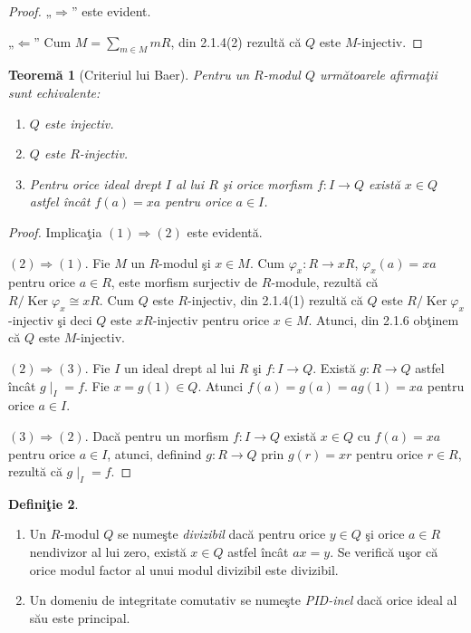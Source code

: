 \documentclass[12pt,a4paper]{book}
\DeclareMathOperator{\Ker}{Ker}
\theoremstyle{plain}
\newtheorem{theorem}{Teoremă}[section] %
\theoremstyle{definition}
\newtheorem{definition}[theorem]{Definiţie}
\theoremstyle{remark}
\begin{document}
\begin{proof}
„\(\Rightarrow\)” este evident.

„\(\Leftarrow\)” Cum \(M = \sum_{m \in M} mR\), din 2.1.4(2) rezultă
că \(Q\) este \(M\)-injectiv.
\end{proof}

\begin{theorem}[Criteriul lui Baer]\label{thm:Baer-ro}
Pentru un \(R\)-modul \(Q\) următoarele afirmaţii sunt echivalente:
\begin{enumerate}
  \item \(Q\) este injectiv.
  \item \(Q\) este \(R\)-injectiv.
  \item Pentru orice ideal drept \(I\) al lui \(R\) şi orice morfism \(f : I \to Q\)
        există \(x \in Q\) astfel încât \(f(a) = xa\) pentru orice \(a \in I\).
\end{enumerate}
\end{theorem}

\begin{proof}
Implicaţia \((1) \Rightarrow (2)\) este evidentă.

\((2) \Rightarrow (1)\).
Fie \(M\) un \(R\)-modul şi \(x \in M\).
Cum \(\varphi_x : R \to xR\), \(\varphi_x(a) = xa\) pentru orice \(a \in R\),
este morfism surjectiv de \(R\)-module, rezultă că
\(R / \Ker \varphi_x \cong xR\).
Cum \(Q\) este \(R\)-injectiv, din 2.1.4(1) rezultă că
\(Q\) este \(R / \Ker \varphi_x\)-injectiv şi deci
\(Q\) este \(xR\)-injectiv pentru orice \(x \in M\).
Atunci, din 2.1.6 obţinem că \(Q\) este \(M\)-injectiv.

\((2) \Rightarrow (3)\).
Fie \(I\) un ideal drept al lui \(R\) şi \(f : I \to Q\).
Există \(g : R \to Q\) astfel încât \(g\!\mid_{I} = f\).
Fie \(x = g(1) \in Q\).
Atunci \(f(a) = g(a) = ag(1) = xa\) pentru orice \(a \in I\).

\((3) \Rightarrow (2)\).
Dacă pentru un morfism \(f : I \to Q\) există \(x \in Q\) cu \(f(a) = xa\)
pentru orice \(a \in I\), atunci, definind
\(g : R \to Q\) prin \(g(r) = xr\) pentru orice \(r \in R\),
rezultă că \(g\!\mid_{I} = f\).
\end{proof}

\begin{definition}
\leavevmode
\begin{enumerate}
  \item Un \(R\)-modul \(Q\) se numeşte \emph{divizibil} dacă pentru orice
        \(y \in Q\) şi orice \(a \in R\) nendivizor al lui zero, există
        \(x \in Q\) astfel încât \(ax = y\).
        Se verifică uşor că orice modul factor al unui modul divizibil este divizibil.
   \item Un domeniu de integritate comutativ se numeşte \emph{PID-inel}
        dacă orice ideal al său este principal.
\end{enumerate}
\end{definition}
\end{document}
